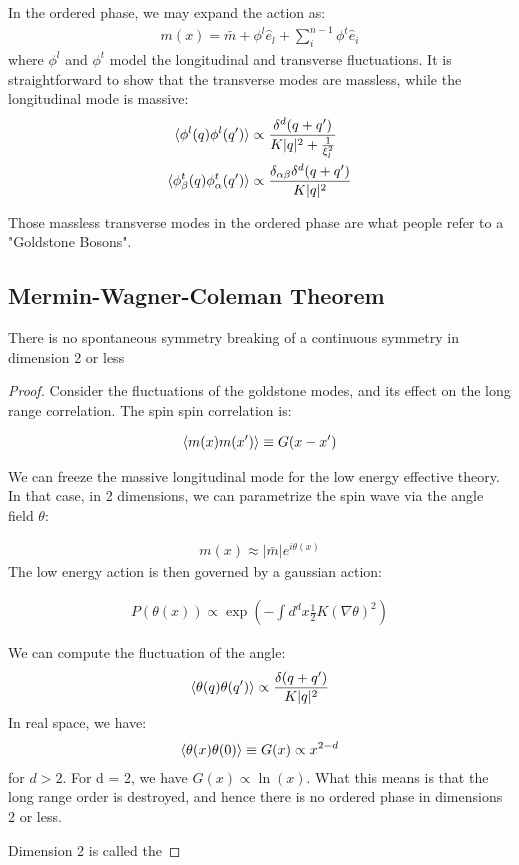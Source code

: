 \documentclass[11pt]{scrartcl}
\begin{document}
In the ordered phase, we may expand the action as:
\begin{align}
m(x) = \bar{m} + \phi^l \hat{e}_l + \sum_i^{n-1} \phi^t \hat{e}_{i}
\end{align}
where $\phi^l$ and $\phi^t$ model the longitudinal and transverse fluctuations.
It is straightforward to show that the transverse modes are massless, while the longitudinal mode
is massive:
\begin{align}
\braket{\phi^l(q) \phi^l(q')} & \propto {\delta^d (q + q') \over K |q|^2 + {1 \over \xi_l^2}} \\
\braket{\phi^t_\beta(q) \phi^t_\alpha(q')} & \propto {\delta_{\alpha \beta} \delta^d (q + q') \over K |q|^2 }
\end{align}

Those massless transverse modes in the ordered phase are what people refer to a "Goldstone Bosons".  

\subsection{Mermin-Wagner-Coleman Theorem}

\begin{theorem}
There is no spontaneous symmetry breaking of a continuous symmetry in dimension 2 or less
\end{theorem}

\begin{proof}
Consider the fluctuations of the goldstone modes, and its effect on the long range correlation.
The spin spin correlation is:

\begin{align}
\braket{m(x) m(x')} \equiv G(x-x')
\end{align}

We can freeze the massive longitudinal mode for the low energy effective theory.  In that case, in 2 dimensions, we can parametrize the spin wave via the angle field $\theta$:

\begin{align}
m(x) \approx |\bar{m}| e^{i \theta(x)}
\end{align}
The low energy action is then governed by a gaussian action:

\begin{align}
P(\theta(x)) \propto \exp \left( -\int d^d x \frac12 K (\nabla \theta)^2 \right)
\end{align}

We can compute the fluctuation of the angle:
\begin{align}
\braket{\theta(q) \theta(q')} \propto {\delta(q + q') \over K |q|^2}
\end{align}
In real space, we have:
\begin{align}
\braket{\theta(x) \theta(0)} \equiv G(x) \propto x^{2-d} 
\end{align}
for $d > 2$.  For d = 2, we have $G(x) \propto \ln(x)$.
What this means is that the long range order is destroyed, and hence there is no ordered phase
in dimensions 2 or less.

Dimension 2 is called the 
\end{proof}
\end{document}
